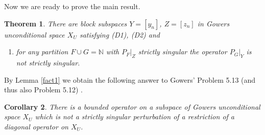\documentclass{amsart}
\newtheorem{theorem}{Theorem}[section]
\newtheorem{corollary}[theorem]{Corollary}
\numberwithin{subsection}{section}
\numberwithin{equation}{section}
\begin{document}
Now we are ready to prove the main result.
\begin{theorem}\label{gow2}
 There are block subspaces $Y=[y_n]$, $Z=[z_n]$ in Gowers unconditional space $X_U$ satisfying (D1), (D2) and 
\begin{enumerate}
 \item[(D3)] for any partition $F\cup G={{\mathbb{N}}}$ with $P_F|_Z$ strictly singular the operator $P_G|_Y$ is not strictly singular.
\end{enumerate}
\end{theorem}
By Lemma \ref{fact1} we obtain the following answer to Gowers' Problem 5.13 (and thus also Problem 5.12) \cite{G2}.
\begin{corollary}
There is a bounded operator on a subspace of Gowers unconditional space $X_U$ which is not a strictly singular perturbation of a restriction of a diagonal operator on $X_U$.
\end{corollary}
\end{document}

